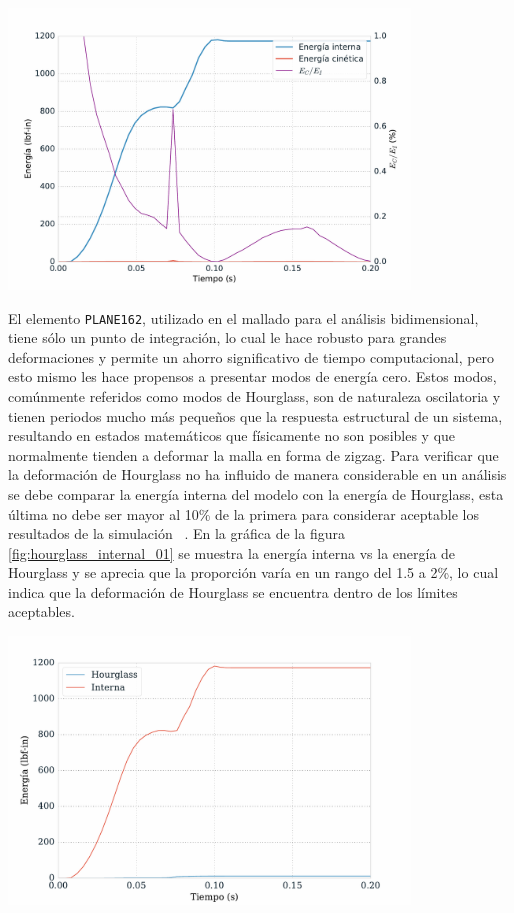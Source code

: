 \begin{center}
\includegraphics[width=0.8\textwidth]{src/ch4/energy_status_01.pdf}
\label{fig:energy_status_01}
\end{center}

El elemento \texttt{PLANE162}, utilizado en el mallado para el análisis bidimensional, 
tiene sólo un punto de integración, lo cual le hace robusto para grandes deformaciones 
y permite un ahorro significativo de tiempo computacional, pero esto mismo les hace 
propensos a presentar modos de energía cero. Estos modos, comúnmente referidos como 
modos de Hourglass, son de naturaleza oscilatoria y tienen periodos mucho más pequeños 
que la respuesta estructural de un sistema, resultando en estados matemáticos que físicamente 
no son posibles y que normalmente tienden a deformar la malla en forma de zigzag.
Para verificar que la deformación de Hourglass no ha influido de manera considerable 
en un análisis se debe comparar la energía interna del modelo con la energía de Hourglass, 
esta última no debe ser mayor al 10\% de la primera para considerar aceptable los 
resultados de la simulación ~\cite{lsdyna-ansys-manual}. En la gráfica de la figura \ref{fig:hourglass_internal_01} 
se muestra la energía interna vs la energía de Hourglass y se aprecia que la proporción 
varía en un rango del 1.5 a 2\%, lo cual indica que la deformación de Hourglass se encuentra 
dentro de los límites aceptables.


\begin{center}
\includegraphics[width=0.8\textwidth]{src/ch4/hourglass_internal_01.pdf}
\label{fig:hourglass_internal_01}
\end{center}


